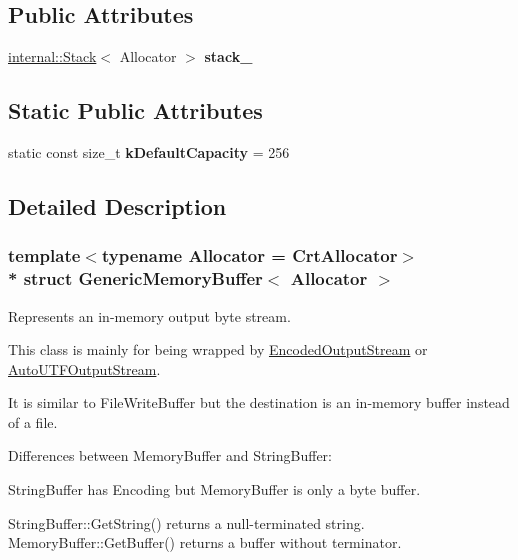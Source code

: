 \subsection*{Public Attributes}
\begin{DoxyCompactItemize}
\item 
\hyperlink{classinternal_1_1Stack}{internal\+::\+Stack}$<$ Allocator $>$ {\bfseries stack\+\_\+}\hypertarget{structGenericMemoryBuffer_a977b479180bebe8ae14ca1c11d52a486}{}\label{structGenericMemoryBuffer_a977b479180bebe8ae14ca1c11d52a486}

\end{DoxyCompactItemize}
\subsection*{Static Public Attributes}
\begin{DoxyCompactItemize}
\item 
static const size\+\_\+t {\bfseries k\+Default\+Capacity} = 256\hypertarget{structGenericMemoryBuffer_af6ecdbdbb8d3aa53cdef6e788e4980be}{}\label{structGenericMemoryBuffer_af6ecdbdbb8d3aa53cdef6e788e4980be}

\end{DoxyCompactItemize}


\subsection{Detailed Description}
\subsubsection*{template$<$typename Allocator = Crt\+Allocator$>$\\*
struct Generic\+Memory\+Buffer$<$ Allocator $>$}

Represents an in-\/memory output byte stream. 

This class is mainly for being wrapped by \hyperlink{classEncodedOutputStream}{Encoded\+Output\+Stream} or \hyperlink{classAutoUTFOutputStream}{Auto\+U\+T\+F\+Output\+Stream}.

It is similar to File\+Write\+Buffer but the destination is an in-\/memory buffer instead of a file.

Differences between Memory\+Buffer and String\+Buffer\+:
\begin{DoxyEnumerate}
\item String\+Buffer has Encoding but Memory\+Buffer is only a byte buffer.
\item String\+Buffer\+::\+Get\+String() returns a null-\/terminated string. Memory\+Buffer\+::\+Get\+Buffer() returns a buffer without terminator.
\end{DoxyEnumerate}


